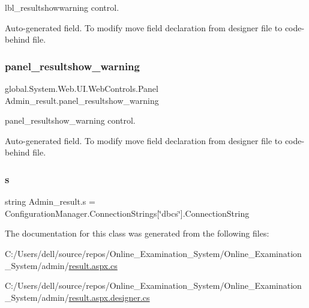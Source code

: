 lbl\+\_\+resultshowwarning control. 

Auto-\/generated field. To modify move field declaration from designer file to code-\/behind file. \mbox{\label{class_admin__result_a4e937bad6adda7f00485a38d3b55b539}} 
\subsubsection{\texorpdfstring{panel\_resultshow\_warning}{panel\_resultshow\_warning}}
{\footnotesize\ttfamily global.\+System.\+Web.\+U\+I.\+Web\+Controls.\+Panel Admin\+\_\+result.\+panel\+\_\+resultshow\+\_\+warning\hspace{0.3cm}{\ttfamily [protected]}}



panel\+\_\+resultshow\+\_\+warning control. 

Auto-\/generated field. To modify move field declaration from designer file to code-\/behind file. \mbox{\label{class_admin__result_a1c2a8f8d70b46da7aae22c85df827aee}} 
\subsubsection{\texorpdfstring{s}{s}}
{\footnotesize\ttfamily string Admin\+\_\+result.\+s = Configuration\+Manager.\+Connection\+Strings\mbox{[}\char`\"{}dbcs\char`\"{}\mbox{]}.Connection\+String\hspace{0.3cm}{\ttfamily [private]}}



The documentation for this class was generated from the following files\+:\begin{DoxyCompactItemize}
\item 
C\+:/\+Users/dell/source/repos/\+Online\+\_\+\+Examination\+\_\+\+System/\+Online\+\_\+\+Examination\+\_\+\+System/admin/\mbox{\hyperlink{result_8aspx_8cs}{result.\+aspx.\+cs}}\item 
C\+:/\+Users/dell/source/repos/\+Online\+\_\+\+Examination\+\_\+\+System/\+Online\+\_\+\+Examination\+\_\+\+System/admin/\mbox{\hyperlink{result_8aspx_8designer_8cs}{result.\+aspx.\+designer.\+cs}}\end{DoxyCompactItemize}

